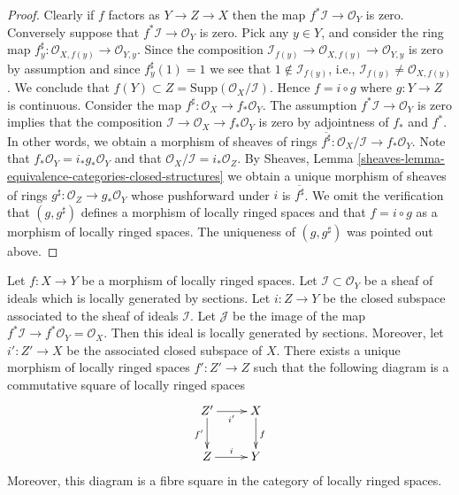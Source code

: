 \begin{proof}
Clearly if $f$ factors as $Y \to Z \to X$ then the map
$f^*\mathcal{I} \to \mathcal{O}_Y$ is zero. Conversely
suppose that $f^*\mathcal{I} \to \mathcal{O}_Y$ is zero.
Pick any $y \in Y$, and consider the ring map
$f^\sharp_y : \mathcal{O}_{X, f(y)} \to \mathcal{O}_{Y, y}$.
Since the composition
$\mathcal{I}_{f(y)} \to \mathcal{O}_{X, f(y)} \to \mathcal{O}_{Y, y}$
is zero by assumption and since $f^\sharp_y(1) = 1$
we see that $1 \not \in \mathcal{I}_{f(y)}$, i.e.,
$\mathcal{I}_{f(y)} \not = \mathcal{O}_{X, f(y)}$. We conclude that
$f(Y) \subset Z = \text{Supp}(\mathcal{O}_X/\mathcal{I})$.
Hence $f = i \circ g$ where $g : Y \to Z$ is continuous.
Consider the map $f^\sharp : \mathcal{O}_X \to f_*\mathcal{O}_Y$.
The assumption $f^*\mathcal{I} \to \mathcal{O}_Y$ is zero implies that
the composition $\mathcal{I} \to \mathcal{O}_X \to f_*\mathcal{O}_Y$ is
zero by adjointness of $f_*$ and $f^*$.
In other words, we obtain a morphism of sheaves of rings
$\overline{f^\sharp} : \mathcal{O}_X/\mathcal{I} \to f_*\mathcal{O}_Y$.
Note that $f_*\mathcal{O}_Y = i_*g_*\mathcal{O}_Y$ and
that $\mathcal{O}_X/\mathcal{I} = i_*\mathcal{O}_Z$.
By Sheaves, Lemma \ref{sheaves-lemma-equivalence-categories-closed-structures}
we obtain a unique morphism of sheaves of rings
$g^\sharp : \mathcal{O}_Z \to g_*\mathcal{O}_Y$ whose pushforward
under $i$ is $\overline{f^\sharp}$. We omit the verification that
$(g, g^\sharp)$ defines a morphism of locally ringed spaces
and that $f = i \circ g$ as a morphism of locally ringed spaces.
The uniqueness of $(g, g^\sharp)$ was pointed out above.
\end{proof}

\begin{lemma}
\label{lemma-restrict-map-to-closed}
Let $f : X \to Y$ be a morphism of locally ringed spaces.
Let $\mathcal{I} \subset \mathcal{O}_Y$ be a sheaf of
ideals which is locally generated by sections.
Let $i : Z \to Y$ be the closed subspace associated to the
sheaf of ideals $\mathcal{I}$.
Let $\mathcal{J}$ be the image of the map
$f^*\mathcal{I} \to f^*\mathcal{O}_Y = \mathcal{O}_X$.
Then this ideal is locally generated by sections.
Moreover, let $i' : Z' \to X$ be the associated closed
subspace of $X$. There exists a unique
morphism of locally ringed spaces $f' : Z' \to Z$ such
that the following diagram is a commutative square of
locally ringed spaces
$$
\xymatrix{
Z' \ar[d]_{f'} \ar[r]_{i'} & X \ar[d]^f \\
Z \ar[r]^{i} & Y
}
$$
Moreover, this diagram is a fibre square in the category of
locally ringed spaces.
\end{lemma}

